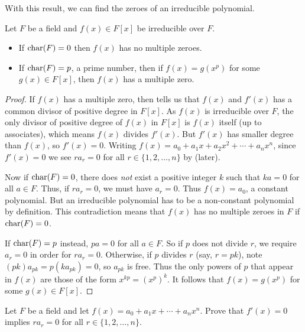 With this result, we can find the zeroes of an irreducible polynomial.
\begin{theorem}\label{thrm-zeroes-of-an-irreducible}
    Let $F$ be a field and $f(x) \in F[x]$ be irreducible over $F$.
    \begin{itemize}
        \item If $\mathrm{char}(F) = 0$ then $f(x)$ has no multiple zeroes.
        \item If $\mathrm{char}(F) = p$, a prime number, then if $f(x) = g(x^p)$ for some $g(x) \in F[x]$, then $f(x)$ has a multiple zero.
    \end{itemize}
\end{theorem}
\begin{proof}
    If $f(x)$ has a multiple zero, then  tells us that $f(x)$ and $f'(x)$ has a common divisor of positive degree in $F[x]$. As $f(x)$ is irreducible over $F$, the only divisor of positive degree of $f(x)$ in $F[x]$ is $f(x)$ itself (up to associates), which means $f(x)$ divides $f'(x)$. But $f'(x)$ has smaller degree than $f(x)$, so $f'(x) = 0$. Writing $f(x) = a_0 + a_1x + a_2x^2 + \cdots + a_nx^n$, since $f'(x) = 0$ we see $ra_r = 0$ for all $r \in \{1, 2, \dots, n\}$ by  (later).

    Now if $\mathrm{char}(F) = 0$, there does \textit{not} exist a positive integer $k$ such that $ka = 0$ for all $a \in F$. Thus, if $ra_r = 0$, we must have $a_r = 0$. Thus $f(x) = a_0$, a constant polynomial. But an irreducible polynomial has to be a non-constant polynomial by definition. This contradiction means that $f(x)$ has no multiple zeroes in $F$ if $\mathrm{char}(F) = 0$.

    If $\mathrm{char}(F) = p$ instead, $pa = 0$ for all $a \in F$. So if $p$ does not divide $r$, we require $a_r = 0$ in order for $ra_r = 0$. Otherwise, if $p$ divides $r$ (say, $r = pk$), note $(pk)a_{pk} = p(ka_{pk}) = 0$, so $a_{pk}$ is free. Thus the only powers of $p$ that appear in $f(x)$ are those of the form $x^{kp} = \left(x^p\right)^k$. It follows that $f(x) = g(x^p)$ for some $g(x) \in F[x]$.
\end{proof}

\begin{exercise}\label{exercise-derivative-is-zero-implies-higher-terms-are-zero}
    Let $F$ be a field and let $f(x) = a_0 + a_1x + \cdots + a_nx^n$. Prove that $f'(x) = 0$ implies $ra_r = 0$ for all $r \in \{1, 2, \dots, n\}$.
\end{exercise}

